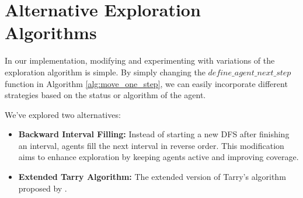 \section{Alternative Exploration Algorithms}
\label{section_method_alt_exploration_alg}

In our implementation, modifying and experimenting with variations of the exploration algorithm is simple.
By simply changing the $define\_agent\_next\_step$ function in Algorithm \ref{alg:move_one_step}, we can easily incorporate different  strategies based on the status or algorithm of the agent.

We've explored two alternatives:

\begin{itemize}
\item \textbf{Backward Interval Filling:} Instead of starting a new DFS after finishing an interval, agents fill the next interval in reverse order. This modification aims to enhance exploration by keeping agents active and improving coverage.
\item \textbf{Extended Tarry Algorithm:} The extended version of Tarry's algorithm proposed by .
\end{itemize}
